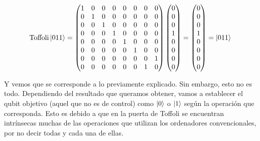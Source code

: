 \documentclass[12pt]{article}
\numberwithin{equation}{section} %
\begin{document}
    \begin{equation*}
        \text{Toffoli} \ket{0 1 1} = \begin{pmatrix}
            1 & 0 & 0 & 0 & 0 & 0 & 0 & 0 \\
            0 & 1 & 0 & 0 & 0 & 0 & 0 & 0 \\
            0 & 0 & 1 & 0 & 0 & 0 & 0 & 0 \\
            0 & 0 & 0 & 1 & 0 & 0 & 0 & 0 \\
            0 & 0 & 0 & 0 & 1 & 0 & 0 & 0 \\
            0 & 0 & 0 & 0 & 0 & 1 & 0 & 0 \\
            0 & 0 & 0 & 0 & 0 & 0 & 0 & 1 \\
            0 & 0 & 0 & 0 & 0 & 0 & 1 & 0 
        \end{pmatrix} \begin{pmatrix}
            0 \\
            0 \\
            0 \\
            1 \\
            0 \\
            0 \\
            0 \\
            0
        \end{pmatrix} = \begin{pmatrix}
            0 \\
            0 \\
            0 \\
            1 \\
            0 \\
            0 \\
            0 \\
            0
        \end{pmatrix} = \ket{0 1 1}
    \end{equation*}

    \vspace{2.5mm}

    Y vemos que se corresponde a lo previamente explicado. Sin embargo, esto no es todo. Dependiendo del resultado que queramos obtener, vamos a establecer el qubit objetivo (aquel que no es de control) como \( \ket{0} \) o \( \ket{1} \) según la operación que corresponda. Esto es debido a que en la puerta de Toffoli se encuentran intrínsecas muchas de las operaciones que utilizan los ordenadores convencionales, por no decir todas y cada una de ellas.
    
\end{document}
